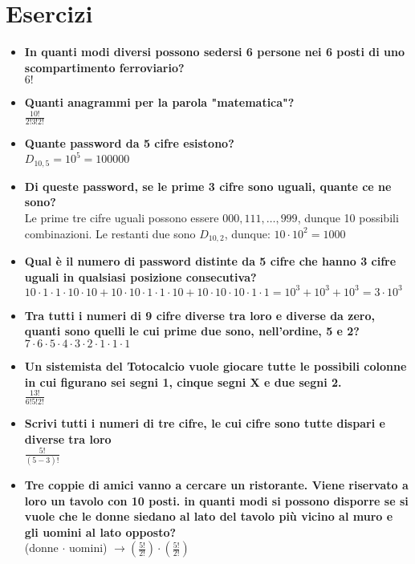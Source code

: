 \documentclass[11pt]{report}
\begin{document}
\section{Esercizi}
\begin{itemize}
	\item \textbf{In quanti modi diversi possono sedersi 6 persone nei 6 posti di uno scompartimento ferroviario?}\\
	$6!$
	\item \textbf{Quanti anagrammi per la parola "matematica"?}\\
	$\frac{10!}{2!3!2!}$
	\item \textbf{Quante password da 5 cifre esistono?}\\
	$D_{10,5} = 10^5 = 100000$
	\item \textbf{Di queste password, se le prime 3 cifre sono uguali, quante ce ne sono?}\\
	Le prime tre cifre uguali possono essere $000, 111, \dots , 999$, dunque 10 possibili combinazioni. Le restanti due sono $D_{10,2}$, dunque: $10 \cdot 10^2 = 1000$
	\item \textbf{Qual è il numero di password distinte da 5 cifre che hanno 3 cifre uguali in qualsiasi posizione consecutiva?}\\
	$10 \cdot 1 \cdot 1 \cdot 10 \cdot 10 + 10 \cdot 10 \cdot 1 \cdot 1 \cdot 10 + 10 \cdot 10 \cdot 10 \cdot 1 \cdot 1 = 10^3 + 10^3 + 10^3 = 3 \cdot 10^3$
	\item \textbf{Tra tutti i numeri di 9 cifre diverse tra loro e diverse da zero, quanti sono quelli le cui prime due sono, nell'ordine, 5 e 2?}\\
	$7 \cdot 6 \cdot 5 \cdot 4 \cdot 3 \cdot 2 \cdot 1 \cdot 1 \cdot 1$
	\item \textbf{Un sistemista del Totocalcio vuole giocare tutte le possibili colonne in cui figurano sei segni 1, cinque segni X e due segni 2.}\\
	$\frac{13!}{6!5!2!}$
	\item \textbf{Scrivi tutti i numeri di tre cifre, le cui cifre sono tutte dispari e diverse tra loro}\\
	$\frac{5!}{(5-3)!}$
	\item \textbf{Tre coppie di amici vanno a cercare un ristorante. Viene riservato a loro un tavolo con 10 posti. in quanti modi si possono disporre se si vuole che le donne siedano al lato del tavolo più vicino al muro e gli uomini al lato opposto?}\\
	(donne $\cdot$ uomini) $\rightarrow \left( \frac{5!}{2!} \right) \cdot \left( \frac{5!}{2!} \right)$

\end{itemize}
\end{document}
